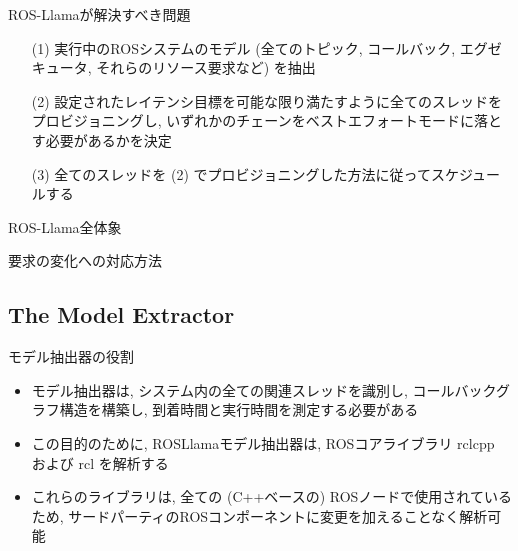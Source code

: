 \begin{frame}{ROS-Llamaが解決すべき問題}
    \begin{enumerate}
        \item[(1)] 実行中のROSシステムのモデル (全てのトピック, コールバック, エグゼキュータ, それらのリソース要求など) を抽出
        \item[(2)] 設定されたレイテンシ目標を可能な限り満たすように全てのスレッドをプロビジョニングし, いずれかのチェーンをベストエフォートモードに落とす必要があるかを決定
        \item[(3)] 全てのスレッドを (2) でプロビジョニングした方法に従ってスケジュールする
    \end{enumerate}
\end{frame}

\begin{frame}{ROS-Llama全体象}
\end{frame}

\begin{frame}{要求の変化への対応方法}
\end{frame}


\subsection{The Model Extractor}
\label{ssec: the model extractor}

\begin{frame}{モデル抽出器の役割}
    \begin{itemize}
        \item モデル抽出器は, システム内の全ての関連スレッドを識別し, コールバックグラフ構造を構築し, 到着時間と実行時間を測定する必要がある
        \item この目的のために, ROSLlamaモデル抽出器は, ROSコアライブラリ $\mathrm{rclcpp}$ および $\mathrm{rcl}$ を解析する
        \item これらのライブラリは, 全ての (C++ベースの) ROSノードで使用されているため, サードパーティのROSコンポーネントに変更を加えることなく解析可能
    \end{itemize}
\end{frame}

